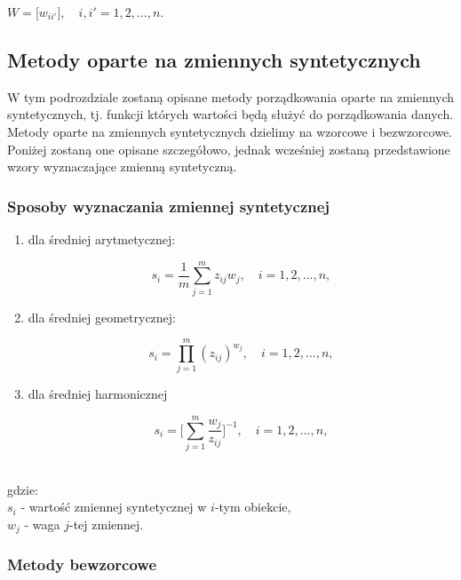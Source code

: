 \documentclass[12pt,a4paper]{report}
\begin{document}
\begin{center}
$W=\lbrack{w_{ii'}\rbrack},\quad i,i'=1, 2, ..., n.$
\end{center}



\newpage
\subsection{Metody oparte na zmiennych syntetycznych}

W tym podrozdziale zostaną opisane metody porządkowania oparte na zmiennych syntetycznych, tj. funkcji których wartości będą służyć do porządkowania danych. Metody oparte na zmiennych syntetycznych dzielimy na wzorcowe i bezwzorcowe. Poniżej zostaną one opisane szczegółowo, jednak wcześniej zostaną przedstawione wzory wyznaczające zmienną syntetyczną. \\

\subsubsection{Sposoby wyznaczania zmiennej syntetycznej}

\begin{enumerate}
\item dla średniej arytmetycznej:
\begin{center}
$$s_{i}=\frac{1}{m} \sum_{j=1}^{m} z_{ij}w_{j},  \quad i=1, 2, ..., n,$$
\end{center}
\item dla średniej geometrycznej:
\begin{center}
$$s_{i}=\prod_{j=1}^{m} (z_{ij})^{w_{j}}, \quad i=1, 2, ..., n,$$
\end{center}
\item dla średniej harmonicznej
\begin{center}
$$s_{i}=\big[\sum_{j=1}^{m} \frac{w_{j}}{z_{ij}}\big]^{-1}, \quad i=1, 2, ..., n,$$\\
\end{center}
\end{enumerate}
gdzie:\\
$s_{i}$ - wartość zmiennej syntetycznej w $i$-tym obiekcie,\\
$w_{j}$ - waga $j$-tej zmiennej.

\subsubsection{Metody bewzorcowe}
\noindent
\end{document}
